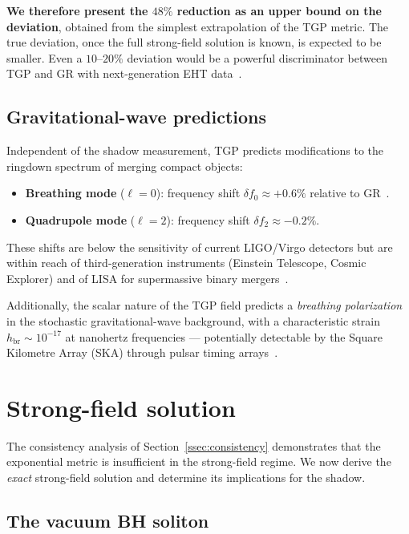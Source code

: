 \documentclass[11pt,a4paper]{article}
\theoremstyle{definition}
\theoremstyle{remark}
\begin{document}
\textbf{We therefore present the $48\%$ reduction as an upper bound on
the deviation}, obtained from the simplest extrapolation of the TGP
metric.  The true deviation, once the full strong-field solution is
known, is expected to be smaller.  Even a $10\text{--}20\%$ deviation
would be a powerful discriminator between TGP and GR with next-generation
EHT data~\cite{Perlick2022}.

\subsection{Gravitational-wave predictions}

Independent of the shadow measurement, TGP predicts modifications to the
ringdown spectrum of merging compact objects:
\begin{itemize}[nosep]
  \item \textbf{Breathing mode} ($\ell = 0$):
    frequency shift $\delta f_0 \approx +0.6\%$ relative to
    GR~\cite{Serafin2026-full}.
  \item \textbf{Quadrupole mode} ($\ell = 2$):
    frequency shift $\delta f_2 \approx -0.2\%$.
\end{itemize}
These shifts are below the sensitivity of current LIGO/Virgo detectors
but are within reach of third-generation instruments (Einstein Telescope,
Cosmic Explorer) and of LISA for supermassive binary
mergers~\cite{Yunes2013,Yunes2009}.

Additionally, the scalar nature of the TGP field predicts a
\emph{breathing polarization} in the stochastic gravitational-wave
background, with a characteristic strain $h_{\mathrm{br}} \sim
10^{-17}$ at nanohertz frequencies --- potentially detectable by the
Square Kilometre Array (SKA) through pulsar timing
arrays~\cite{Yunes2013}.

\section{Strong-field solution}\label{sec:strong-field}

The consistency analysis of Section~\ref{ssec:consistency} demonstrates
that the exponential metric is insufficient in the strong-field regime.
We now derive the \emph{exact} strong-field solution and determine
its implications for the shadow.

\subsection{The vacuum BH soliton}\label{ssec:soliton}
\end{document}
